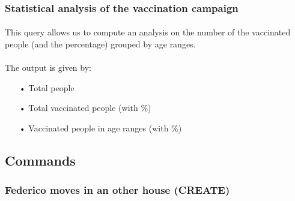 \documentclass[a4paper,12pt]{article}
\begin{document}
\subsubsection{Statistical analysis of the vaccination campaign}
\paragraph{} This query allows us to compute an analysis on the number of the vaccinated people (and the percentage) grouped by age ranges.
\begin{center}
\end{center}
\paragraph{} The output is given by: 
\begin{itemize}
\item[•] Total people
\item[•] Total vaccinated people (with \%)
\item[•] Vaccinated people in age ranges (with \%)
\begin{center}
\end{center}
\end{itemize}

\subsection{Commands}
\subsubsection{Federico moves in an other house (CREATE)}
\end{document}
